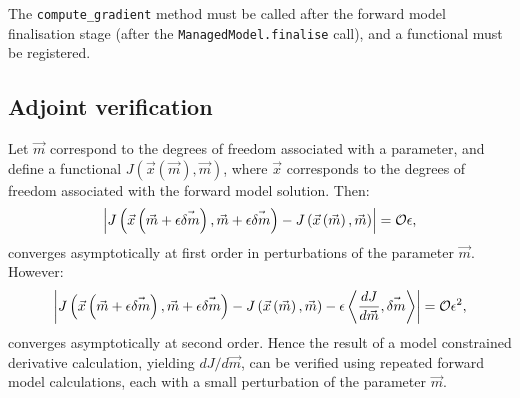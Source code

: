 \documentclass[a4paper]{book}
\begin{document}
The \verb+compute_gradient+ method must be called after the forward model
finalisation stage (after the \verb+ManagedModel.finalise+ call), and a
functional must be registered.

\subsection{Adjoint verification}

Let $\vec{m}$ correspond to the degrees of freedom associated with a parameter,
and define a functional
$J \left( \vec{x} \left( \vec{m} \right), \vec{m} \right)$, where $\vec{x}$
corresponds to the degrees of freedom associated with the forward model solution.
Then:
\begin{equation}
  \left| J \left( \vec{x} \left( \vec{m} + \epsilon \vec{\delta m} \right), \vec{m} + \epsilon \vec{\delta m} \right)
    - J \left( \vec{x} \left( \vec{m} \right), \vec{m} \right) \right|
    = {\cal O} \epsilon,
\end{equation}
converges asymptotically at first order in perturbations of the parameter
$\vec{m}$. However:
\begin{equation}
  \left| J \left( \vec{x} \left( \vec{m} + \epsilon \vec{\delta m} \right), \vec{m} + \epsilon \vec{\delta m} \right)
    - J \left( \vec{x} \left( \vec{m} \right), \vec{m} \right)
    - \epsilon \left< \frac{d J}{d \vec{m}}, \vec{\delta m} \right> \right|
    = {\cal O} \epsilon^2,
\end{equation}
converges asymptotically at second order. Hence the result of a model
constrained derivative calculation, yielding $d J / d \vec{m}$, can be verified
using repeated forward model calculations, each with a small perturbation of the
parameter $\vec{m}$.
\end{document}
